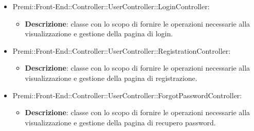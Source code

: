 	\begin{itemize}
		\item  Premi::Front-End::Controller::UserController::LoginController: 
			 \begin{itemize}
				\item \textbf{Descrizione}: classe con lo scopo di fornire le operazioni necessarie alla visualizzazione e gestione della pagina di login.
			\end{itemize}
		 \item Premi::Front-End::Controller::UserController::RegistrationController:
			\begin{itemize}
				\item \textbf{Descrizione}: classe con lo scopo di fornire le operazioni necessarie alla visualizzazione e gestione della pagina di registrazione.
			\end{itemize}
		\item  Premi::Front-End::Controller::UserController::ForgotPasswordController: 
			 \begin{itemize}
				\item \textbf{Descrizione}: classe con lo scopo di fornire le operazioni necessarie alla visualizzazione e gestione della pagina di recupero password.
			\end{itemize}
	\end{itemize}
